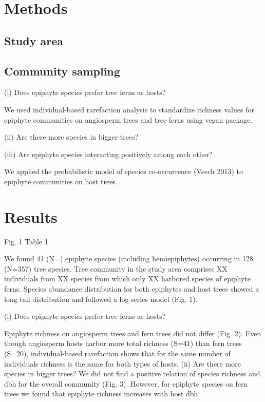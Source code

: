 \documentclass{article}
\begin{document}
\section*{Methods}

\subsection*{Study area}

\subsection*{Community sampling}

(i) Does epiphyte species prefer tree ferns as hosts?

We used individual-based rarefaction analysis to standardize richness values for epiphyte communities on angiosperm trees and tree ferns using vegan package.

(ii) Are there more species in bigger trees?

(iii) Are epiphyte species interacting positively among each other?

We applied the probabilistic model of species co-occurrence (Veech 2013) to epiphyte communities on host trees.

\section{Results}

Fig. 1
Table 1
	 	 	
We found 41 (N=) epiphyte species (including hemiepiphytes) occurring in 128 (N=357) tree species. Tree community in the study area comprises XX individuals from XX species from which only XX harbored species of epiphyte ferns. Species abundance distribution for both epiphytes and host trees showed a long tail distribution and followed a log-series model (Fig. 1). 



(i) Does epiphyte species prefer tree ferns as hosts?

Epiphyte richness on angiosperm trees and fern trees did not differ (Fig. 2). Even though angiosperm hosts harbor more total richness (S=41) than fern trees (S=20), individual-based rarefaction shows that for the same number of individuals richness is the same for both types of hosts.
(ii) Are there more species in bigger trees?
We did not find a positive relation of species richness and dbh for the overall community (Fig. 3). However, for epiphyte species on fern trees we found that epiphyte richness increases with host dbh.
\end{document}
